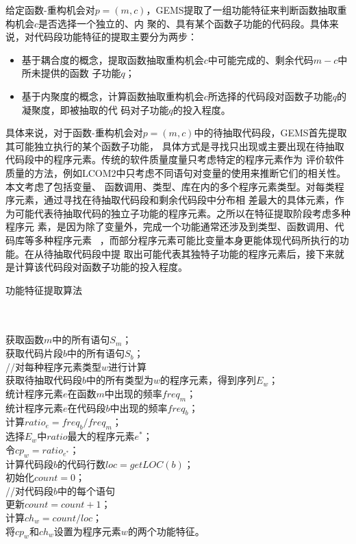 给定函数-重构机会对$p=(m,c)$，GEMS提取了一组功能特征来判断函数抽取重构机会$c$是否选择一个独立的、内
聚的、具有某个函数子功能的代码段。具体来说，对代码段功能特征的提取主要分为两步：
\begin{itemize}
  \item 基于耦合度的概念，提取函数抽取重构机会$c$中可能完成的、剩余代码$m-c$中所未提供的函数
  子功能$q$；
  \item 基于内聚度的概念，计算函数抽取重构机会$c$所选择的代码段对函数子功能$q$的凝聚度，即被抽取的代
  码对子功能$q$的投入程度。
\end{itemize}

具体来说，对于函数-重构机会对$p=(m,c)$中的待抽取代码段，GEMS首先提取其可能独立执行的某个函数子功能，
具体方式是寻找只出现或主要出现在待抽取代码段中的程序元素。传统的软件质量度量只考虑特定的程序元素作为
评价软件质量的方法，例如LCOM$2$中只考虑不同语句对变量的使用来推断它们的相关性。本文考虑了包括变量、
函数调用、类型、库在内的多个程序元素类型。对每类程序元素，通过寻找在待抽取代码段和剩余代码段中分布相
差最大的具体元素，作为可能代表待抽取代码的独立子功能的程序元素。之所以在特征提取阶段考虑多种程序元
素，是因为除了变量外，完成一个功能通常还涉及到类型、函数调用、代码库等多种程序元素
~\cite{martin2003agile}，而部分程序元素可能比变量本身更能体现代码所执行的功能。在从待抽取代码段中提
取出可能代表其独特子功能的程序元素后，接下来就是计算该代码段对函数子功能的投入程度。

\begin{algorithm}[H]
\caption{功能特征提取算法}\label{alg:feature}
\\
\\
获取函数$m$中的所有语句$S_m$；\\
获取代码片段$b$中的所有语句$S_b$；\\
 {
  //对每种程序元素类型$w$进行计算\\
  获取待抽取代码段$b$中的所有类型为$w$的程序元素，得到序列$E_w$；\\
   {
    统计程序元素$e$在函数$m$中出现的频率$freq_m$；\\
    统计程序元素$e$在代码段$b$中出现的频率$freq_b$；\\
    计算$ratio_e = freq_b/freq_m$；\\
  }
  选择$E_w$中$ratio$最大的程序元素$e^*$；\\
  令$cp_w = ratio_{e^*}$；\\
  计算代码段$b$的代码行数$loc = getLOC(b)$；\\
  初始化$count = 0$；\\
   {
    //对代码段$b$中的每个语句\\
     {
      更新$count = count + 1$；\\
    }
  }
  计算$ch_w = count/loc$；\\
  将$cp_w$和$ch_w$设置为程序元素$w$的两个功能特征。\\
}
\end{algorithm}

